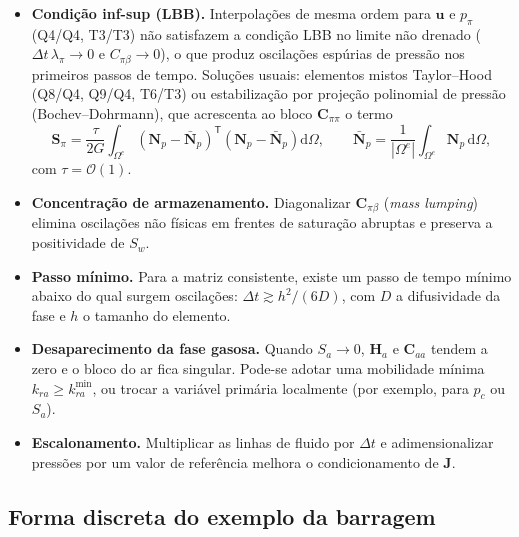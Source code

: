 \documentclass[11pt,a4paper]{article}
\numberwithin{equation}{section}
\newcommand{\dd}{\mathrm{d}}
\begin{document}
\begin{itemize}
\item \textbf{Condição inf-sup (LBB).} Interpolações de mesma ordem para
$\mathbf u$ e $p_\pi$ (Q4/Q4, T3/T3) não satisfazem a condição LBB no
limite não drenado ($\Delta t\,\lambda_\pi\to0$ e $C_{\pi\beta}\to0$), o que
produz oscilações espúrias de pressão nos primeiros passos de tempo.
Soluções usuais: elementos mistos Taylor--Hood (Q8/Q4, Q9/Q4, T6/T3) ou
estabilização por projeção polinomial de pressão
(Bochev--Dohrmann), que acrescenta ao bloco $\mathbf C_{\pi\pi}$ o termo
\begin{equation}
\mathbf S_\pi=\frac{\tau}{2G}\int_{\Omega^e}\left(\mathbf N_p-\bar{\mathbf N}_p\right)^{\mathsf T}\left(\mathbf N_p-\bar{\mathbf N}_p\right)\dd\Omega,
\qquad \bar{\mathbf N}_p=\frac{1}{|\Omega^e|}\int_{\Omega^e}\mathbf N_p\,\dd\Omega,
\end{equation}
com $\tau=\mathcal O(1)$.
\item \textbf{Concentração de armazenamento.} Diagonalizar $\mathbf C_{\pi\beta}$
(\emph{mass lumping}) elimina oscilações não físicas em frentes de
saturação abruptas e preserva a positividade de $S_w$.
\item \textbf{Passo mínimo.} Para a matriz consistente, existe um passo de
tempo mínimo abaixo do qual surgem oscilações:
$\Delta t\gtrsim h^2/(6D)$, com $D$ a difusividade da fase e $h$ o tamanho
do elemento.
\item \textbf{Desaparecimento da fase gasosa.} Quando $S_a\to0$, $\mathbf H_a$
e $\mathbf C_{aa}$ tendem a zero e o bloco do ar fica singular. Pode-se
adotar uma mobilidade mínima $k_{ra}\geq k_{ra}^{\min}$, ou trocar a
variável primária localmente (por exemplo, para $p_c$ ou $S_a$).
\item \textbf{Escalonamento.} Multiplicar as linhas de fluido por $\Delta t$
e adimensionalizar pressões por um valor de referência melhora o
condicionamento de $\mathbf J$.
\end{itemize}

\subsection{Forma discreta do exemplo da barragem}
\end{document}
